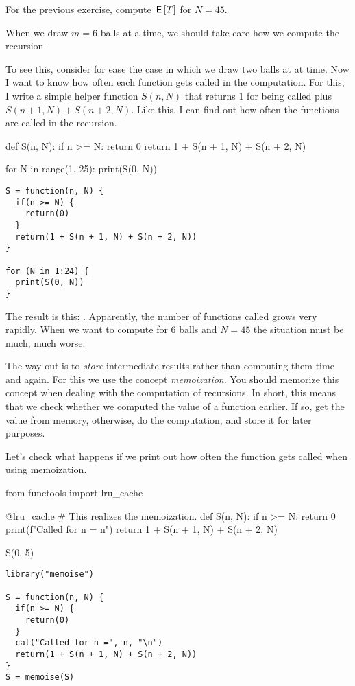 \begin{exercise}
For the previous exercise, compute $\,\mathsf{E}\left[T\right]$ for $N=45$.
\begin{solution}
  When we draw $m=6$ balls at a time, we should take care how we compute the recursion.

  To see this, consider for ease the case in which we draw two balls at at time.  Now I want to know how often each function gets called in the computation. For this, I write a simple helper function $S(n, N)$ that returns $1$ for being called plus $S(n+1, N) + S(n+2, N)$. Like this, I can find out how often the functions are called in the recursion.

\begin{pyblock}
def S(n, N):
    if n >= N:
        return 0
    return 1 + S(n + 1, N) + S(n + 2, N)


for N in range(1, 25):
    print(S(0, N))
\end{pyblock}
\begin{verbatim}
S = function(n, N) {
  if(n >= N) {
    return(0)
  }
  return(1 + S(n + 1, N) + S(n + 2, N))
}

for (N in 1:24) {
  print(S(0, N))
}
\end{verbatim}
The result is this: \printpythontex.
Apparently, the number of functions called grows very rapidly.
When we want to compute for 6 balls and $N=45$ the situation must be much, much worse.

The way out is to \emph{store} intermediate results rather than computing them time and again.
For this we use the concept \emph{memoization}.
You should memorize this concept when dealing with the computation of recursions.
In short, this means that we check whether we computed the value of a function earlier.
If so, get the value from memory, otherwise, do the computation, and store it for later purposes.

Let's check what happens if we print out how often the function gets called when using memoization.
\begin{pyblock}
from functools import lru_cache

@lru_cache   # This realizes the memoization.
def S(n, N):
    if n >= N:
        return 0
    print(f"Called for n = {n}\n")
    return 1 + S(n + 1, N) + S(n + 2, N)


S(0, 5)
\end{pyblock}
\begin{verbatim}
library("memoise")

S = function(n, N) {
  if(n >= N) {
    return(0)
  }
  cat("Called for n =", n, "\n")
  return(1 + S(n + 1, N) + S(n + 2, N))
}
S = memoise(S)


\end{verbatim}
\end{solution}
\end{exercise}
